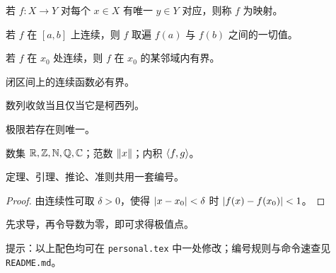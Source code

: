 \documentclass[12pt, a4paper, oneside, UTF8]{ctexbook}
\begin{document}
\begin{minipage}[t]{0.485\linewidth}
\begin{definition}[示例]
  若 $f:X\to Y$ 对每个 $x\in X$ 有唯一 $y\in Y$ 对应，则称 $f$ 为映射。
\end{definition}
\begin{theorem}[介值定理]
  若 $f$ 在 $[a,b]$ 上连续，则 $f$ 取遍 $f(a)$ 与 $f(b)$ 之间的一切值。
\end{theorem}
\begin{lemma}[局部有界性]
  若 $f$ 在 $x_0$ 处连续，则 $f$ 在 $x_0$ 的某邻域内有界。
\end{lemma}
\begin{corollary}[有界性]
  闭区间上的连续函数必有界。
\end{corollary}
\end{minipage}\hfill
\begin{minipage}[t]{0.485\linewidth}
\begin{criterion}[柯西收敛准则]
  数列收敛当且仅当它是柯西列。
\end{criterion}
\begin{proposition}[唯一性]
  极限若存在则唯一。
\end{proposition}
\begin{example}[快捷命令]
  数集 $\mathbb{R},\mathbb{Z},\mathbb{N},\mathbb{Q},\mathbb{C}$；范数 $\left\lVert x \right\rVert$；内积 $\left\langle f,g \right\rangle$。
\end{example}
\begin{remark}[说明]
  定理、引理、推论、准则共用一套编号。
\end{remark}
\end{minipage}

\vspace{2mm}
\begin{proof}
  由连续性可取 $\delta>0$，使得 $\left\lvert x-x_0 \right\rvert<\delta$ 时 $\left\lvert f(x)-f(x_0) \right\rvert<1$。\qedhere
\end{proof}
\begin{solution}
  先求导，再令导数为零，即可求得极值点。
\end{solution}

\vfill
{\footnotesize\color{black!60}
提示：以上配色均可在 \texttt{personal.tex} 中一处修改；编号规则与命令速查见 \texttt{README.md}。}
\end{document}
